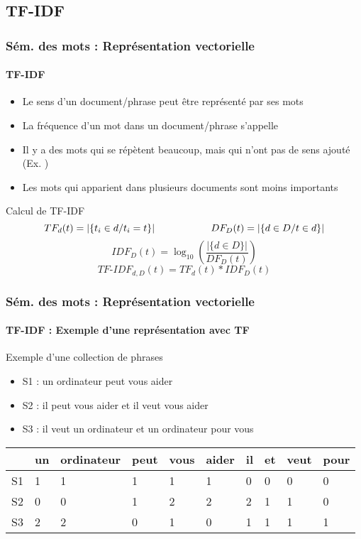\documentclass[xcolor=table]{beamer}
\begin{document}
\subsection{TF-IDF}

\begin{frame}
\frametitle{Sém. des mots : Représentation vectorielle}
\framesubtitle{TF-IDF}

\begin{itemize}
	\item Le sens d'un document/phrase peut être représenté par ses mots 
	\item La fréquence d'un mot dans un document/phrase s'appelle 
	\item Il y a des mots qui se répètent beaucoup, mais qui n'ont pas de sens ajouté (Ex. )
	\item Les mots qui apparient dans plusieurs documents sont moins importants
\end{itemize}

\begin{block}{Calcul de TF-IDF}
	\[
	TF_d(t) =  |\{t_i \in d / t_i = t\}|
	\hskip2cm 
	DF_D(t) = |\{d \in D / t \in d\}|
	\]
	\[IDF_D(t) = \log_{10} \left( \frac{|\{d \in D\}|}{DF_D(t)} \right)\]
	\[TF\text{-}IDF_{d, D}(t) = TF_d(t) * IDF_D(t)\]
\end{block}

\end{frame}


\begin{frame}
\frametitle{Sém. des mots : Représentation vectorielle}
\framesubtitle{TF-IDF : Exemple d'une représentation avec TF}

\begin{exampleblock}{Exemple d'une collection de phrases}
	\begin{itemize}
		\item S1 : un ordinateur peut vous aider
		\item S2 : il peut vous aider et il veut vous aider
		\item S3 : il veut un ordinateur et un ordinateur pour vous
	\end{itemize}
\end{exampleblock}

\begin{center}
	\begin{tabular}{llllllllll}
	\hline\hline
	& un & ordinateur & peut & vous & aider & il & et & veut & pour \\
	\hline
	S1 & 1 & 1 & 1 & 1 & 1 & 0 & 0 & 0 & 0\\
	S2 & 0 & 0 & 1 & 2 & 2 & 2 & 1 & 1 & 0\\
	S3 & 2 & 2 & 0 & 1 & 0 & 1 & 1 & 1 & 1\\
	\hline\hline
\end{tabular}
\end{center}

\end{frame}
\end{document}
